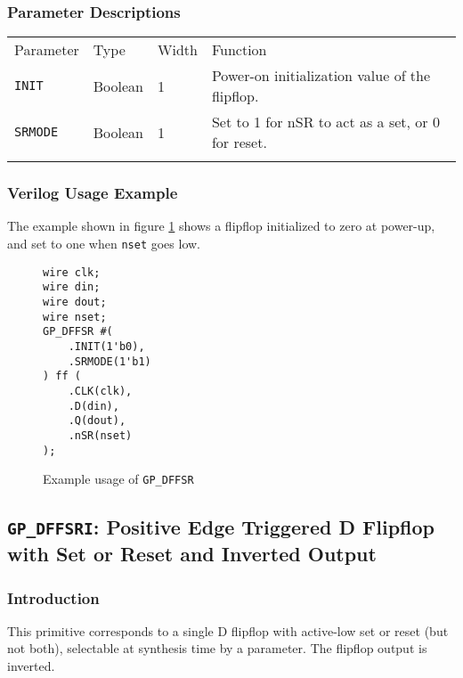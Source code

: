 \documentclass[11pt]{article}
\newcommand{\tokenstyle}[1]{\texttt{#1}}
\newcommand{\wirestyle}[1]{\texttt{#1}}
\newcommand{\whenstyle}[1]{{\fontseries{sb}\selectfont#1}}
\newcommand{\thinhline}{\Xhline{1\arrayrulewidth}}
\newcommand{\thickhline}{\Xhline{2.5\arrayrulewidth}}
\begin{document}
\subsubsection{Parameter Descriptions}

\begin{tabularx}{\textwidth}{lllX}
\thinhline
\whenstyle{Parameter} & \whenstyle{Type} & \whenstyle{Width} & \whenstyle{Function} \\
\thickhline
\tokenstyle{INIT} & Boolean & 1 & Power-on initialization value of the flipflop. \\
\thinhline
\tokenstyle{SRMODE} & Boolean & 1 & Set to 1 for nSR to act as a set, or 0 for reset. \\
\thinhline
\end{tabularx}

\subsubsection{Verilog Usage Example}

The example shown in figure \ref{gp-dffsr-example} shows a flipflop initialized to zero at power-up, and set to one
when \wirestyle{nset} goes low.

\begin{figure}[h]
\begin{lstlisting}
wire clk;
wire din;
wire dout;
wire nset;
GP_DFFSR #(
	.INIT(1'b0),
	.SRMODE(1'b1)
) ff (
	.CLK(clk),
	.D(din),
	.Q(dout),
	.nSR(nset)
);
\end{lstlisting}
\caption{Example usage of \tokenstyle{GP\_DFFSR}}
\label{gp-dffsr-example}
\end{figure}


\pagebreak
\subsection{\tokenstyle{GP\_DFFSRI}: Positive Edge Triggered D Flipflop with Set or Reset and Inverted Output}
\label{gp-dffsri}

\subsubsection{Introduction}
This primitive corresponds to a single D flipflop with active-low set or reset (but not both), selectable at synthesis
time by a parameter. The flipflop output is inverted.
\end{document}
